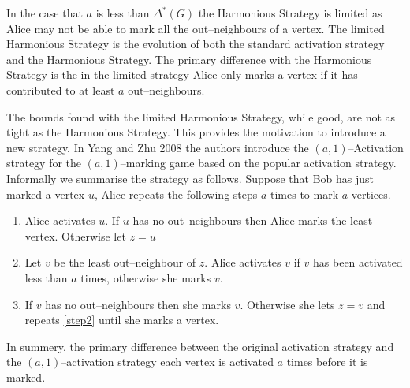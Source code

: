 In the case that $a$ is less than $\Delta^*(G)$ the Harmonious Strategy is limited as Alice may not be able to mark all the out--neighbours of a vertex. The limited Harmonious Strategy is the evolution of both the standard activation strategy and the Harmonious Strategy. The primary difference with the Harmonious Strategy is the in the limited strategy Alice only marks a vertex if it has contributed to at least $a$ out--neighbours.    

The bounds found with the limited Harmonious Strategy, while good, are not as tight as the Harmonious Strategy. This provides the motivation to introduce a new strategy. In Yang and Zhu 2008 \cite{yangZhu2008} the authors introduce the $(a,1)$--Activation strategy for the $(a,1)$--marking game based on the popular activation strategy. Informally we summarise the strategy as follows. Suppose that Bob has just marked a vertex $u$, Alice repeats the following steps $a$ times to mark $a$ vertices.
\begin{enumerate}
    \item Alice activates $u$. If $u$ has no out--neighbours then Alice marks the least vertex. Otherwise let $z=u$
    
    \item Let $v$ be the least out--neighbour of $z$. Alice activates $v$ if $v$ has been activated less than $a$ times, otherwise she marks $v$. \label{step2}
    
    \item If $v$ has no out--neighbours then she marks $v$. Otherwise she lets $z=v$ and repeats \ref{step2} until she marks a vertex.     
\end{enumerate}
In summery, the primary difference between the original activation strategy and the $(a,1)$--activation strategy each vertex is activated $a$ times before it is marked.


